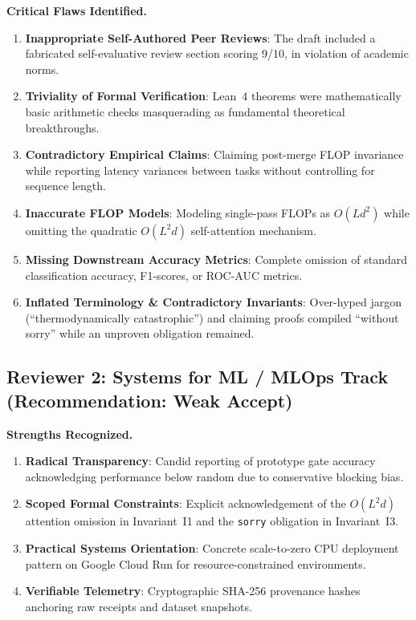 \documentclass[conference]{IEEEtran}
\begin{document}
\noindent\textbf{Critical Flaws Identified.}
\begin{enumerate}
  \item \textbf{Inappropriate Self-Authored Peer Reviews}: The draft included a fabricated self-evaluative review section scoring 9/10, in violation of academic norms.
  \item \textbf{Triviality of Formal Verification}: Lean~4 theorems were mathematically basic arithmetic checks masquerading as fundamental theoretical breakthroughs.
  \item \textbf{Contradictory Empirical Claims}: Claiming post-merge FLOP invariance while reporting latency variances between tasks without controlling for sequence length.
  \item \textbf{Inaccurate FLOP Models}: Modeling single-pass FLOPs as $O(L d^2)$ while omitting the quadratic $O(L^2 d)$ self-attention mechanism.
  \item \textbf{Missing Downstream Accuracy Metrics}: Complete omission of standard classification accuracy, F1-scores, or ROC-AUC metrics.
  \item \textbf{Inflated Terminology \& Contradictory Invariants}: Over-hyped jargon (``thermodynamically catastrophic'') and claiming proofs compiled ``without sorry'' while an unproven obligation remained.
\end{enumerate}

\subsection{Reviewer 2: Systems for ML / MLOps Track (Recommendation: Weak Accept)}
\label{subsec:rev2}

\noindent\textbf{Strengths Recognized.}
\begin{enumerate}
  \item \textbf{Radical Transparency}: Candid reporting of prototype gate accuracy acknowledging performance below random due to conservative blocking bias.
  \item \textbf{Scoped Formal Constraints}: Explicit acknowledgement of the $O(L^2 d)$ attention omission in Invariant~I1 and the \texttt{sorry} obligation in Invariant~I3.
  \item \textbf{Practical Systems Orientation}: Concrete scale-to-zero CPU deployment pattern on Google Cloud Run for resource-constrained environments.
  \item \textbf{Verifiable Telemetry}: Cryptographic SHA-256 provenance hashes anchoring raw receipts and dataset snapshots.
\end{enumerate}
\end{document}
